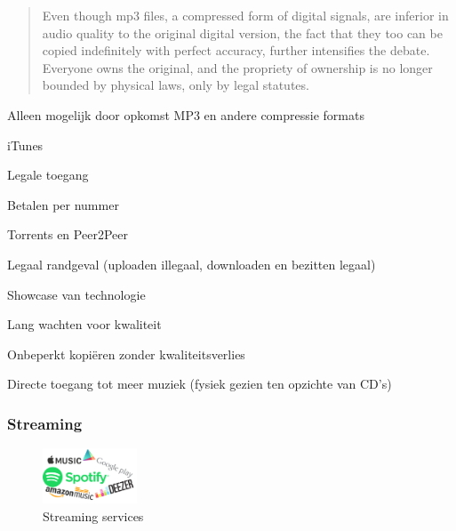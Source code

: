 \begin{quotation}
    Even though mp3 files, a compressed form of digital signals, are inferior in audio quality to the original digital version, the fact that they too can be copied indefinitely with perfect accuracy, further intensifies the debate. Everyone owns the original, and the propriety of ownership is no longer bounded by physical laws, only by legal statutes.
\end{quotation}
\citep{lansky2004importance}


\begin{todolist}
    \item Alleen mogelijk door opkomst MP3 en andere compressie formats
    \item iTunes \begin{todolist}
        \item Legale toegang
        \item Betalen per nummer
    \end{todolist}
    \item Torrents en Peer2Peer \begin{todolist}
        \item Legaal randgeval (uploaden illegaal, downloaden en bezitten legaal)
        \item Showcase van technologie
        \item Lang wachten voor kwaliteit
    \end{todolist}
    \item Onbeperkt kopiëren zonder kwaliteitsverlies
    \item Directe toegang tot meer muziek (fysiek gezien ten opzichte van CD's)
\end{todolist}

\subsubsection*{Streaming}
\begin{figure}
    \centering
    \includegraphics[width=0.25\textwidth]{assets/critical-review/StreamingServices.png}
    \caption{Streaming services}
    \label{fig:critical-review:StreamingServices}
\end{figure}

